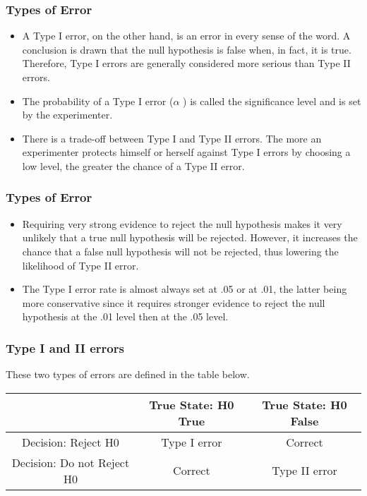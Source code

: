 \begin{frame}
\frametitle{Types of Error}
\large
\begin{itemize}
\item
A Type I error, on the other hand, is an error in every sense of the word. A conclusion is drawn that the null hypothesis is false when, in fact, it is true. Therefore, Type I errors are generally considered more serious than Type II errors. 
 \item
The probability of a Type I error ($\alpha$ ) is called the significance level and is set by the experimenter. \item There is a trade-off between Type I and Type II errors. The more an experimenter protects himself or herself against Type I errors by choosing a low level, the greater the chance of a Type II error. 
\end{itemize}
\end{frame}

\begin{frame}
\frametitle{Types of Error}
\large
\begin{itemize}
\item 
Requiring very strong evidence to reject the null hypothesis makes it very unlikely that a true null hypothesis will be rejected. However, it increases the chance that a false null hypothesis will not be rejected, thus lowering the likelihood of Type II error. 
\item
The Type I error rate is almost always set at .05 or at .01, the latter being more conservative since it requires stronger evidence to reject the null hypothesis at the .01 level then at the .05 level. 
\end{itemize}
\end{frame}




\begin{frame}
\frametitle{Type I and II errors}
\large
These two types of errors are defined in the table below. 

\begin{center}
\begin{tabular}{|c|c|c|}
\hline 
&True State: H0 True	& True State: H0 False\\\hline
Decision: Reject H0	& Type I error&	Correct\\
Decision: Do not Reject H0	& Correct 	&Type II error\\ \hline
\end{tabular}
\end{center}

\end{frame}

